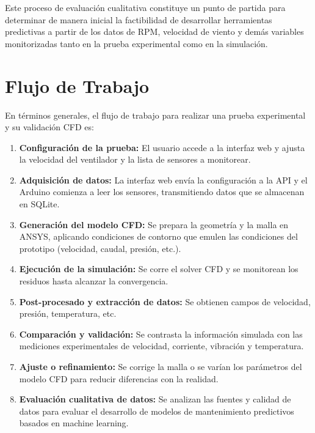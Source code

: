 \noindent
Este proceso de evaluación cualitativa constituye un punto de partida para determinar de manera inicial la factibilidad de desarrollar herramientas predictivas a partir de los datos de RPM, velocidad de viento y demás variables monitorizadas tanto en la prueba experimental como en la simulación.


\section{Flujo de Trabajo}
En términos generales, el flujo de trabajo para realizar una prueba experimental y su validación CFD es:
\begin{enumerate}
    \item \textbf{Configuración de la prueba:} El usuario accede a la interfaz web y ajusta la velocidad del ventilador y la lista de sensores a monitorear.
    \item \textbf{Adquisición de datos:} La interfaz web envía la configuración a la API y el Arduino comienza a leer los sensores, transmitiendo datos que se almacenan en SQLite.
    \item \textbf{Generación del modelo CFD:} Se prepara la geometría y la malla en ANSYS, aplicando condiciones de contorno que emulen las condiciones del prototipo (velocidad, caudal, presión, etc.).
    \item \textbf{Ejecución de la simulación:} Se corre el solver CFD y se monitorean los residuos hasta alcanzar la convergencia.
    \item \textbf{Post-procesado y extracción de datos:} Se obtienen campos de velocidad, presión, temperatura, etc. 
    \item \textbf{Comparación y validación:} Se contrasta la información simulada con las mediciones experimentales de velocidad, corriente, vibración y temperatura.
    \item \textbf{Ajuste o refinamiento:} Se corrige la malla o se varían los parámetros del modelo CFD para reducir diferencias con la realidad.
    \item \textbf{Evaluación cualitativa de datos:} Se analizan las fuentes y calidad de datos para evaluar el desarrollo de modelos de mantenimiento predictivos basados en machine learning.
\end{enumerate}

\pagebreak

